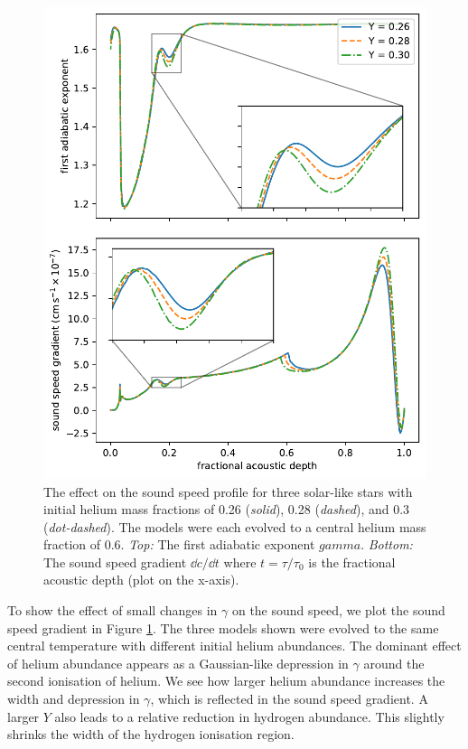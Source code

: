 \begin{figure}[!tbp]
    \centering
    \includegraphics{figures/helium-ionisation-sound-speed.pdf}
    \caption{The effect on the sound speed profile for three solar-like stars with initial helium mass fractions of 0.26 (\emph{solid}), 0.28 (\emph{dashed}), and 0.3 (\emph{dot-dashed}). The models were each evolved to a central helium mass fraction of 0.6. \emph{Top:} The first adiabatic exponent \(gamma\). \emph{Bottom:} The sound speed gradient \(\dd c/\dd t\) where \(t = \tau/\tau_0\) is the fractional acoustic depth (plot on the x-axis).}
    \label{fig:gamma-sound-speed}
\end{figure}

To show the effect of small changes in \(\gamma\) on the sound speed, we plot the sound speed gradient in Figure \ref{fig:gamma-sound-speed}. The three models shown were evolved to the same central temperature with different initial helium abundances. The dominant effect of helium abundance appears as a Gaussian-like depression in \(\gamma\) around the second ionisation of helium. We see how larger helium abundance increases the width and depression in \(\gamma\), which is reflected in the sound speed gradient. A larger \(Y\) also leads to a relative reduction in hydrogen abundance. This slightly shrinks the width of the hydrogen ionisation region.

